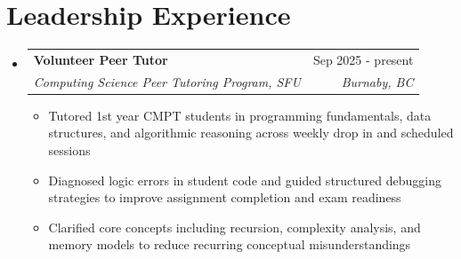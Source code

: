 \documentclass[letterpaper, 11pt]{article}
\makeatletter
\newcommand{\resumeItem}[1]{
  \item\small{
    {#1 \vspace{-2pt}}
  }
}
\newcommand{\resumeSubheading}[4]{
  \vspace{-2pt}\item
    \begin{tabular*}{0.97\textwidth}[t]{l@{\extracolsep{\fill}}r}
      \textbf{#1} & #2 \\
      \textit{\small#3} & \textit{\small #4} \\
    \end{tabular*}\vspace{-7pt}
}
\newcommand{\resumeSubHeadingListStart}{\begin{itemize}[leftmargin=0.15in, label={}]}
\newcommand{\resumeSubHeadingListEnd}{\end{itemize}}
\newcommand{\resumeItemListStart}{\begin{itemize}}
\newcommand{\resumeItemListEnd}{\end{itemize}\vspace{-5pt}}
\makeatother
\begin{document}




\section{Leadership Experience}
\resumeSubHeadingListStart

\resumeSubheading
{Volunteer Peer Tutor}{Sep 2025 - present}
{Computing Science Peer Tutoring Program, SFU}{Burnaby, BC}
\resumeItemListStart
\resumeItem{Tutored 1st year CMPT students in programming fundamentals, data structures, and algorithmic reasoning across weekly drop in and scheduled sessions}
\resumeItem{Diagnosed logic errors in student code and guided structured debugging strategies to improve assignment completion and exam readiness}
\resumeItem{Clarified core concepts including recursion, complexity analysis, and memory models to reduce recurring conceptual misunderstandings}
\resumeItemListEnd

\resumeSubHeadingListEnd
\end{document}
